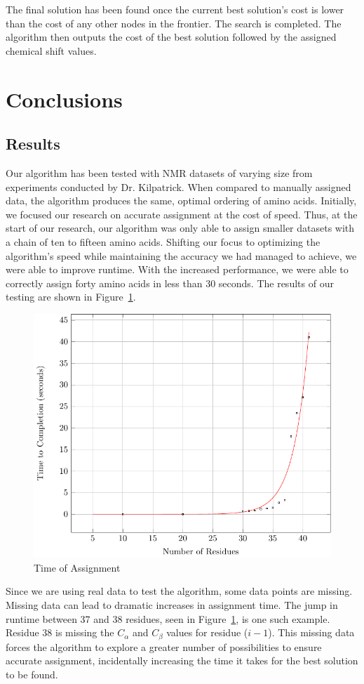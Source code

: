 \documentclass[12pt, letter]{article}
\begin{document}
The final solution has been found once the current best solution's cost is lower than the cost of any other nodes in the frontier. The search is completed. The algorithm then outputs the cost of the best solution followed by the assigned chemical shift values. 

\section{Conclusions}
\label{sec:conclusions}

\subsection{Results}
\label{sub:results}
Our algorithm has been tested with NMR datasets of varying size from experiments conducted by Dr. Kilpatrick.  When compared to manually assigned data, the algorithm produces the same, optimal ordering of amino acids. Initially, we focused our research on accurate assignment at the cost of speed. Thus, at the start of our research, our algorithm was only able to assign smaller datasets with a chain of ten to fifteen amino acids. Shifting our focus to optimizing the algorithm's speed while maintaining the accuracy we had managed to achieve, we were able to improve runtime. With the increased performance, we were able to correctly assign forty amino acids in less than 30 seconds. The results of our testing are shown in Figure~\ref{fig:plot}.

\begin{figure}[H]
\begin{center}
\includegraphics[width=.6\textwidth]{plot}
\end{center}
\caption{Time of Assignment} 
\label{fig:plot}
\end{figure}

Since we are using real data to test the algorithm, some data points are missing. Missing data can lead to dramatic increases in assignment time. The jump in runtime between 37 and 38 residues, seen in Figure~\ref{fig:plot}, is one such example. Residue 38 is missing the $C_\alpha$ and $C_{\beta}$ values for residue ($i-1$). This missing data forces the algorithm to explore a greater number of possibilities to ensure accurate assignment, incidentally increasing the time it takes for the best solution to be found. 
\end{document}
